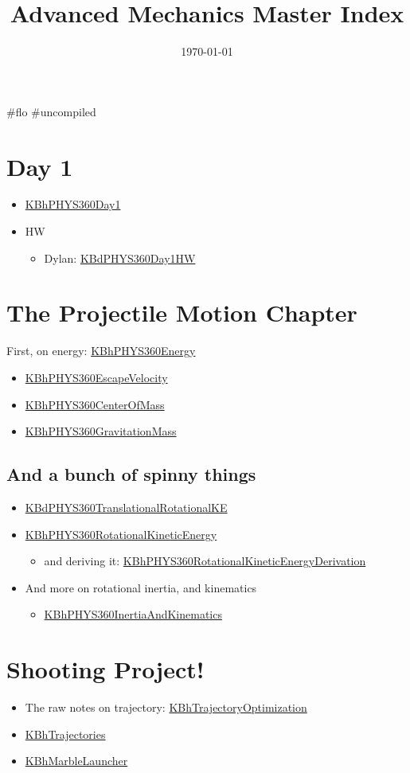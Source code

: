 \documentclass[letterpaper]{article}
\date{\today}
\title{Advanced Mechanics Master Index}
\renewcommand{\tableofcontents}{}
\begin{document}
\tableofcontents

\#flo \#uncompiled

\section{Day 1}
\label{sec:orgf765468}
\begin{itemize}
\item \href{KBhPHYS360Day1.org}{KBhPHYS360Day1}
\item HW

\begin{itemize}
\item Dylan: \href{KBdPHYS360Day1HW.org}{KBdPHYS360Day1HW}
\end{itemize}
\end{itemize}

\section{The Projectile Motion Chapter}
\label{sec:org2759ec9}
First, on energy: \href{KBhPHYS360Energy.org}{KBhPHYS360Energy}

\begin{itemize}
\item \href{KBhPHYS360EscapeVelocity.org}{KBhPHYS360EscapeVelocity}
\item \href{KBhPHYS360CenterOfMass.org}{KBhPHYS360CenterOfMass}
\item \href{KBhPHYS360GravitationMass.org}{KBhPHYS360GravitationMass}
\end{itemize}

\subsection{And a bunch of spinny things}
\label{sec:org2e856c6}
\begin{itemize}
\item \href{KBdPHYS360TranslationalRotationalKE.org}{KBdPHYS360TranslationalRotationalKE}
\item \href{KBhPHYS360RotationalKineticEnergy.org}{KBhPHYS360RotationalKineticEnergy}

\begin{itemize}
\item and deriving it:
\href{KBhPHYS360RotationalKineticEnergyDerivation.org}{KBhPHYS360RotationalKineticEnergyDerivation}
\end{itemize}

\item And more on rotational inertia, and kinematics

\begin{itemize}
\item \href{KBhPHYS360InertiaAndKinematics.org}{KBhPHYS360InertiaAndKinematics}
\end{itemize}
\end{itemize}

\section{Shooting Project!}
\label{sec:orgd8f11cb}
\begin{itemize}
\item The raw notes on trajectory:
\href{KBhTrajectoryOptimization.org}{KBhTrajectoryOptimization}
\item \href{KBhTrajectories.org}{KBhTrajectories}
\item \href{KBhMarbleLauncher.org}{KBhMarbleLauncher}
\end{itemize}
\end{document}
